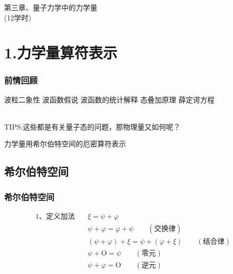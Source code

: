 \begin{frame} [plain]
    \frametitle{}
    \Background[1] 
    \begin{center}
    { {\huge 第三章、量子力学中的力学量 \\ (12学时)}}
    \end{center}  
    \addtocounter{framenumber}{-1}   
\end{frame}

\section{1.力学量算符表示}

\begin{frame}
    \frametitle{前情回顾}
    \begin{itemize}
        \Item 波粒二象性
        \Item 波函数假说
        \Item 波函数的统计解释
        \Item 态叠加原理
        \Item 薛定谔方程
    \end{itemize}
    ~~\\ \vspace{1.0em}
    \hspace{2em}\alert{TIPS:}这些都是有关量子态的问题，那物理量又如何呢？
\end{frame} 

\begin{frame}    
    \begin{tcolorbox4}
    力学量用希尔伯特空间的厄密算符表示
    \end{tcolorbox4}
\end{frame} 

\subsection{希尔伯特空间}

\begin{frame} 
    \frametitle{希尔伯特空间}
    \begin{equation*}
        \begin{split}
            \text{1、定义加法} \quad  &\xi=\psi+\varphi\\
            &\psi+\varphi=\varphi+\psi \qquad (\text{交换律})\\
            &(\psi+\varphi)+\xi=\psi+(\varphi+\xi) \qquad (\text{结合律})\\
            &\psi+\text{O}= \psi \qquad (\text{零元})\\
            &\psi+\varphi= \text{O} \qquad (\text{逆元})\\
        \end{split}  
    \end{equation*}
\end{frame} 


